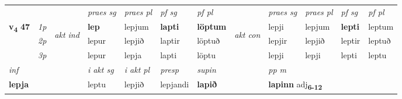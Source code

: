\begin{longtable}[l]{X>{\footnotesize\itshape}llXXXXlXXXX}
 & &   & \textit{praes sg}  & \textit{praes pl}    & \textit{ pf sg} & \textit{pf pl} & & \textit{praes sg}  & \textit{praes pl}    & \textit{pf sg} & \textit{pf pl }  \\ \cmidrule{4-7} \cmidrule{9-12}
 \multirow{2}{*}{{{\textbf{v{\textsubscript{4}}} \Large{\textbf{47}}}}}  & 1p & \multirow{3}{*}{\begin{turn}{90}\textit{akt ind}\end{turn}} & \textbf{lep} & lepjum & \textbf{lapti} & \textbf{löptum} & \multirow{3}{*}{\begin{turn}{90}\textit{akt con}\end{turn}} &lepji & lepjum & \textbf{lepti} & leptum\\*
 & 2p &  &  lepur  & lepjið & laptir & löptuð & & lepjir & lepjið & leptir & leptuð \\*
 & 3p &  & lepur & lepja & lapti & löptu & & lepji & lepji& lepti & leptu \\*
\cmidrule{4-7} \cmidrule{9-12}

   {\textit{inf}} & &  & \textit{i akt sg} & \textit{i akt pl}   & \textit{presp} & \textit{supin}  && \textit{pp m} \\*
  {\textbf{lepja}} & && leptu  & lepjið   & lepjandi &  \textbf{lapið}  && \multicolumn{2}{l}{\textbf{lapinn} adj\textbf{\textsubscript{6-12}}} \\*

\midrule


\end{longtable}
